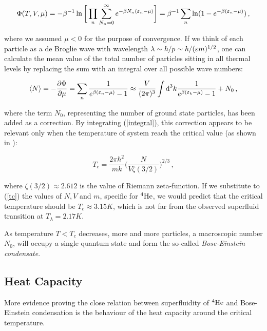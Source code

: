 \begin{equation}
\Phi (T, V, \mu)
=-\beta^{-1} \ln \bigg[\displaystyle \prod_{n}
  \displaystyle \sum_{N_n=0}^{\infty}
  e^{-\beta N_n (\varepsilon_n - \mu) } \bigg]
= \beta^{-1} \displaystyle \sum_{n} \ln (1 - e^{-\beta (\varepsilon_n - \mu)})\,,
\label{partition}
\end{equation}

where we assumed $\mu<0$ for the purpose of convergence. If we think of each particle as a de Broglie wave with wavelength $\lambda \sim \hbar/p \sim \hbar/(\varepsilon m)^{1/2}$, one can calculate the mean value of the total number of particles sitting in all thermal levels by replacing the sum with an integral over all possible wave numbers:

\begin{equation}
\langle N\rangle = -\frac{\partial\Phi}{\partial\mu}
= \sum_n \frac{1}{e^{\beta(\varepsilon_n-\mu)}-1}
\approx
\frac{V}{(2\pi)^3}\int \text{d}^3k \frac{1}{e^{\beta(\varepsilon_k-\mu)}-1} + N_0\,,
\label{integral}
\end{equation}

where the term $N_0$, representing the number of ground state particles, has been added as a correction.
By integrating (\ref{integral}), this correction appears to be relevant only when the temperature of system reach the critical value (as shown in \cite{tong}):

\begin{equation}
T_c = \frac{2\pi \hbar^2}{mk} \bigg ( \frac{N}{V \zeta(3/2)}\bigg)^{2/3}\,,
\label{tc}
\end{equation}

where $\zeta(3/2)\approx 2.612$ is the value of Riemann zeta-function. If we substitute to (\ref{tc}) the values of $ N, V$ and $ m $, specific for $ {}^4\mathrm{He} $, we would predict that the critical temperature  should be $ T_c \approx 3.15\unit{K} $, which is not far from the observed superfluid transition at $ T_{\lambda} = 2.17 \unit{K} $.

As temperature $T<T_c$ decreases, more and more particles, a macroscopic number $N_0$, will occupy a single quantum state and form the so-called \textit{Bose-Einstein condensate}.


\subsection*{Heat Capacity}
More evidence proving the close relation between superfluidity of $ {}^4\mathrm{He} $  and Bose-Einstein condensation is the behaviour of the heat capacity around the critical temperature.

